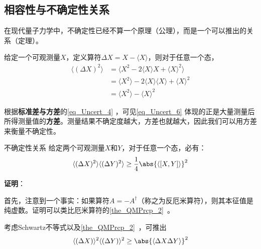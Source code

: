 


\subsection{相容性与不确定性关系}

在现代量子力学中，不确定性已经不算一个原理（公理），而是一个可以推出的关系（定理）。

给定一个可观测量$X$，定义算符$\Delta X=X-\langle X \rangle$，则对于任意一个态，
\begin{equation}\label{eq_Uncert_6}
\begin{aligned}
\langle (\Delta X)^2 \rangle &= \langle X^2-2\langle X \rangle X + \langle X \rangle^2 \rangle\\
&=\langle X^2\rangle -2\langle X \rangle \langle X \rangle + \langle X \rangle^2\\
&=\langle X^2 \rangle - \langle X \rangle^2
\end{aligned}
\end{equation}

根据\textbf{标准差与方差}的\autoref{eq_Uncert_4} ，可见\autoref{eq_Uncert_6} 体现的正是大量测量后所得测量值的\textbf{方差}。测量结果不确定度越大，方差也就越大，因此我们可以用方差来衡量不确定性。

\begin{theorem}{不确定性关系}\label{the_Uncert_1}
给定两个可观测量$X$和$Y$，对于任意一个态，必有：
\begin{equation}\label{eq_Uncert_9}
\langle (\Delta X)^2 \rangle\langle (\Delta Y)^2 \rangle \geq \frac{1}{4}\abs{\langle [X, Y] \rangle}^2
\end{equation}
\end{theorem}


\textbf{证明}：

首先，注意到一个事实：如果算符$A=-A^\dagger$（称之为反厄米算符），则其本征值是纯虚数。证明可以类比厄米算符的\autoref{the_QMPrcp_2}~。

考虑Schwartz不等式以及\autoref{the_QMPrcp_2}~，可推出
\begin{equation}\label{eq_Uncert_7}
\langle (\Delta X)\rangle^2\langle (\Delta Y)\rangle^2\geq \abs{\langle \Delta X \Delta Y \rangle}^2
\end{equation}

